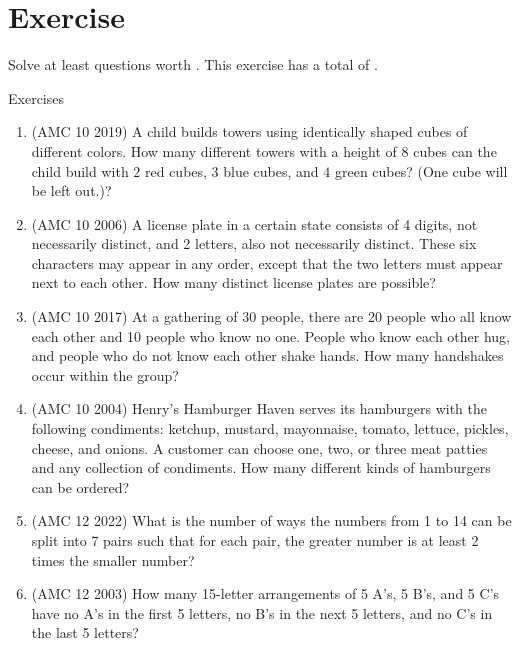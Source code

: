 \section{Exercise}
Solve at least questions worth . This exercise has a total of .
\begin{xcb}{Exercises}
\begin{enumerate}
\item(AMC 10 2019)  A child builds towers using identically shaped cubes of different colors. How many different towers with a height of $8$ cubes can the child build with $2$ red cubes, $3$ blue cubes, and $4$ green cubes? (One cube will be left out.)?
\begin{hint}
\end{hint}
\item (AMC 10 2006)  A license plate in a certain state consists of 4 digits, not necessarily distinct, and 2 letters, also not necessarily distinct. These six characters may appear in any order, except that the two letters must appear next to each other. How many distinct license plates are possible?
\begin{hint}
\end{hint}
\item (AMC 10 2017)  At a gathering of 30 people, there are 20 people who all know each other and 10 people who know no one. People who know each other hug, and people who do not know each other shake hands. How many handshakes occur within the group?
\item (AMC 10 2004)  Henry’s Hamburger Haven serves its hamburgers with the following condiments: ketchup, mustard, mayonnaise, tomato, lettuce, pickles, cheese, and onions. A customer can choose one, two, or three meat patties and any collection of condiments. How many different kinds of hamburgers can be ordered?
\item (AMC 12 2022)  What is the number of ways the numbers from 1 to 14 can be split into 7 pairs such that for each pair, the greater number is at least 2 times the smaller number?
\begin{hint}
\end{hint}
\item(AMC 12 2003)  How many 15-letter arrangements of 5 A’s, 5 B’s, and 5 C’s have no A’s in the first 5 letters, no B’s in the next 5 letters, and no C’s in the last 5 letters?

\end{enumerate}
\end{xcb}
